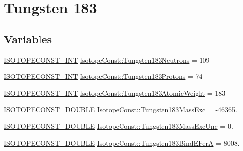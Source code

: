 \hypertarget{group___isotope_const-_tungsten-_w183}{}\section{Tungsten 183}
\label{group___isotope_const-_tungsten-_w183}
\subsection*{Variables}
\begin{DoxyCompactItemize}
\item 
\mbox{\hyperlink{group___isotope_const-_macros_ga5f18360b3e99483a35c32d789e62621c}{I\+S\+O\+T\+O\+P\+E\+C\+O\+N\+S\+T\+\_\+\+I\+NT}} \mbox{\hyperlink{group___isotope_const-_tungsten-_w183_gae246ce1de62a2789f72f100178582037}{Isotope\+Const\+::\+Tungsten183\+Neutrons}} = 109
\item 
\mbox{\hyperlink{group___isotope_const-_macros_ga5f18360b3e99483a35c32d789e62621c}{I\+S\+O\+T\+O\+P\+E\+C\+O\+N\+S\+T\+\_\+\+I\+NT}} \mbox{\hyperlink{group___isotope_const-_tungsten-_w183_ga7f866673fe01b627484879a45d7ba610}{Isotope\+Const\+::\+Tungsten183\+Protons}} = 74
\item 
\mbox{\hyperlink{group___isotope_const-_macros_ga5f18360b3e99483a35c32d789e62621c}{I\+S\+O\+T\+O\+P\+E\+C\+O\+N\+S\+T\+\_\+\+I\+NT}} \mbox{\hyperlink{group___isotope_const-_tungsten-_w183_ga0f231d23a5cd70d5a9441215462ddc65}{Isotope\+Const\+::\+Tungsten183\+Atomic\+Weight}} = 183
\item 
\mbox{\hyperlink{group___isotope_const-_macros_ga8f45a7272ce02c0b4c65c44636ed719a}{I\+S\+O\+T\+O\+P\+E\+C\+O\+N\+S\+T\+\_\+\+D\+O\+U\+B\+LE}} \mbox{\hyperlink{group___isotope_const-_tungsten-_w183_gacbff8d9805cc71177333bfcd1dae6556}{Isotope\+Const\+::\+Tungsten183\+Mass\+Exc}} = -\/46365.
\item 
\mbox{\hyperlink{group___isotope_const-_macros_ga8f45a7272ce02c0b4c65c44636ed719a}{I\+S\+O\+T\+O\+P\+E\+C\+O\+N\+S\+T\+\_\+\+D\+O\+U\+B\+LE}} \mbox{\hyperlink{group___isotope_const-_tungsten-_w183_ga4361250690c725b0fd216a5b827bf4fc}{Isotope\+Const\+::\+Tungsten183\+Mass\+Exc\+Unc}} = 0.
\item 
\mbox{\hyperlink{group___isotope_const-_macros_ga8f45a7272ce02c0b4c65c44636ed719a}{I\+S\+O\+T\+O\+P\+E\+C\+O\+N\+S\+T\+\_\+\+D\+O\+U\+B\+LE}} \mbox{\hyperlink{group___isotope_const-_tungsten-_w183_ga10e2474950b1662cbba4175db3467811}{Isotope\+Const\+::\+Tungsten183\+Bind\+E\+PerA}} = 8008.
\item 

\end{DoxyCompactItemize}
